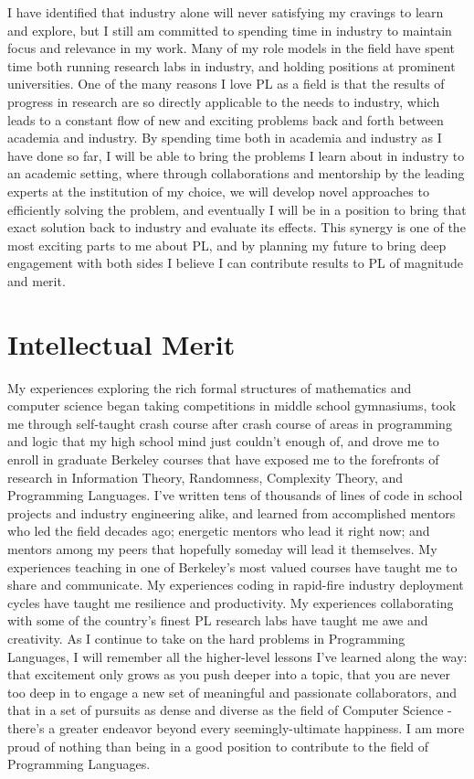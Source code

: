 \documentclass{nsf-grfp}
\begin{document}
I have identified that industry alone will never satisfying my cravings to learn and explore, but I still am committed to spending time in industry to maintain focus and relevance in my work. Many of my role models in the field have spent time both running research labs in industry, and holding positions at prominent universities. One of the many reasons I love PL as a field is that the results of progress in research are so directly applicable to the needs to industry, which leads to a constant flow of new and exciting problems back and forth between academia and industry. By spending time both in academia and industry as I have done so far, I will be able to bring the problems I learn about in industry to an academic setting, where through collaborations and mentorship by the leading experts at the institution of my choice, we will develop novel approaches to efficiently solving the problem, and eventually I will be in a position to bring that exact solution back to industry and evaluate its effects. This synergy is one of the most exciting parts to me about PL, and by planning my future to bring deep engagement with both sides I believe I can contribute results to PL of magnitude and merit.

\section*{Intellectual Merit}

My experiences exploring the rich formal structures of mathematics and computer science began taking competitions in middle school gymnasiums, took me through self-taught crash course after crash course of areas in programming and logic that my high school mind just couldn't enough of, and drove me to enroll in graduate Berkeley courses that have exposed me to the forefronts of research in Information Theory, Randomness, Complexity Theory, and Programming Languages. I've written tens of thousands of lines of code in school projects and industry engineering alike, and learned from accomplished mentors who led the field decades ago; energetic mentors who lead it right now; and mentors among my peers that hopefully someday will lead it themselves. My experiences teaching in one of Berkeley's most valued courses have taught me to share and communicate. My experiences coding in rapid-fire industry deployment cycles have taught me resilience and productivity. My experiences collaborating with some of the country's finest PL research labs have taught me awe and creativity. As I continue to take on the hard problems in Programming Languages, I will remember all the higher-level lessons I've learned along the way: that excitement only grows as you push deeper into a topic, that you are never too deep in to engage a new set of meaningful and passionate collaborators, and that in a set of pursuits as dense and diverse as the field of Computer Science - there's a greater endeavor beyond every seemingly-ultimate happiness. I am more proud of nothing than being in a good position to contribute to the field of Programming Languages.
\end{document}
